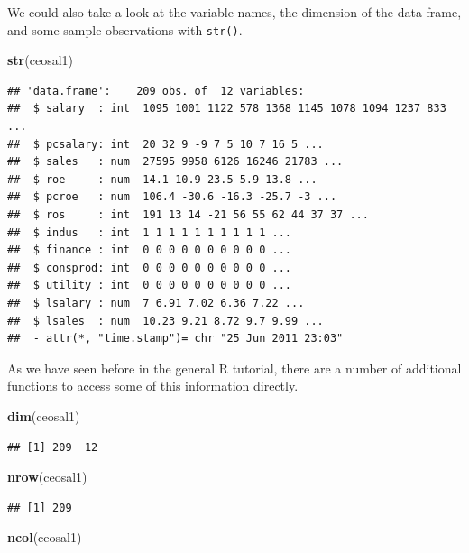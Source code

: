 \documentclass[]{book}
\newenvironment{Shaded}{\begin{snugshade}}{\end{snugshade}}
\newcommand{\KeywordTok}[1]{\textcolor[rgb]{0.13,0.29,0.53}{\textbf{#1}}}
\newcommand{\NormalTok}[1]{#1}
\begin{document}
We could also take a look at the variable names, the dimension of the data frame, and some sample observations with \texttt{str()}.

\begin{Shaded}
\begin{Highlighting}[]
\KeywordTok{str}\NormalTok{(ceosal1)}
\end{Highlighting}
\end{Shaded}

\begin{verbatim}
## 'data.frame':    209 obs. of  12 variables:
##  $ salary  : int  1095 1001 1122 578 1368 1145 1078 1094 1237 833 ...
##  $ pcsalary: int  20 32 9 -9 7 5 10 7 16 5 ...
##  $ sales   : num  27595 9958 6126 16246 21783 ...
##  $ roe     : num  14.1 10.9 23.5 5.9 13.8 ...
##  $ pcroe   : num  106.4 -30.6 -16.3 -25.7 -3 ...
##  $ ros     : int  191 13 14 -21 56 55 62 44 37 37 ...
##  $ indus   : int  1 1 1 1 1 1 1 1 1 1 ...
##  $ finance : int  0 0 0 0 0 0 0 0 0 0 ...
##  $ consprod: int  0 0 0 0 0 0 0 0 0 0 ...
##  $ utility : int  0 0 0 0 0 0 0 0 0 0 ...
##  $ lsalary : num  7 6.91 7.02 6.36 7.22 ...
##  $ lsales  : num  10.23 9.21 8.72 9.7 9.99 ...
##  - attr(*, "time.stamp")= chr "25 Jun 2011 23:03"
\end{verbatim}

As we have seen before in the general R tutorial, there are a number of additional functions to access some of this information directly.

\begin{Shaded}
\begin{Highlighting}[]
\KeywordTok{dim}\NormalTok{(ceosal1)}
\end{Highlighting}
\end{Shaded}

\begin{verbatim}
## [1] 209  12
\end{verbatim}

\begin{Shaded}
\begin{Highlighting}[]
\KeywordTok{nrow}\NormalTok{(ceosal1)}
\end{Highlighting}
\end{Shaded}

\begin{verbatim}
## [1] 209
\end{verbatim}

\begin{Shaded}
\begin{Highlighting}[]
\KeywordTok{ncol}\NormalTok{(ceosal1)}
\end{Highlighting}
\end{Shaded}
\end{document}
